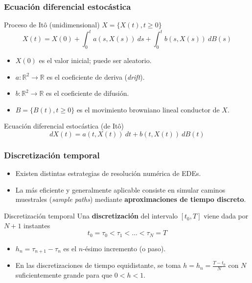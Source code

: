 \documentclass[10pt]{beamer}
\newcommand{\Real}{\mathbb{R}}
\newcommand{\Dif}[1]{d #1}
\newcommand{\Intt}[4]{\int_{#1}^{#2}{#3~\Dif{#4}}}
\begin{document}
\frame
{
    \frametitle{Ecuación diferencial estocástica}

    \begin{block}{Proceso de Itô (unidimensional) $X = \{X(t), t \geq 0\}$}
    \begin{displaymath}
        X(t) = X(0) + \Intt{0}{t}{a(s,X(s))}{s} + \Intt{0}{t}{b(s,X(s))}{B(s)}
    \end{displaymath}
    \end{block}
    \vspace{-0.1cm}
    \begin{itemize}
        \item<2-> $X(0)$ es el valor inicial; puede ser aleatorio.
        \item<3-> $a : \Real^2 \to \Real$ es el coeficiente de deriva (\textsl{drift}).
        \item<4-> $b : \Real^2 \to \Real$ es el coeficiente de difusión.
        \item<5-> $B = \{B(t), t \geq 0\}$ es el movimiento browniano lineal conductor de $X$.
    \end{itemize}

    {
    \begin{block}{Ecuación diferencial estocástica (de Itô)}
    \begin{displaymath}
        \Dif{X(t)} = a(t,X(t)) ~\Dif{t} + b(t,X(t)) ~\Dif{B(t)}
    \end{displaymath}
    \end{block}
    }
}

\frame
{
    \frametitle{Discretización temporal}

    \begin{itemize}
        \item Existen distintas estrategias de resolución numérica de EDEs.
        \item La más eficiente y generalmente aplicable consiste en simular
        caminos muestrales (\textsl{sample paths}) mediante \textbf{aproximaciones 
        de tiempo discreto}.
    \end{itemize}

    {
        \begin{block}{Discretización temporal}
        Una \textbf{discretización} del intervalo $[t_0, T]$ viene dada por 
        $N+1$ instantes
        $$t_0 = \tau_0 < \tau_1 < \dots < \tau_N = T$$
        \end{block}
    }

        \begin{itemize}
            \item<3-> $h_n = \tau_{n+1} - \tau_n$ es el $n$-ésimo incremento (o paso).
            \item<4-> En las discretizaciones de tiempo equidistante, se toma $h = h_n = \frac{T - t_0}{N}$
            con $N$ suficientemente grande para que $0 < h < 1$.
        \end{itemize}
}
\end{document}
